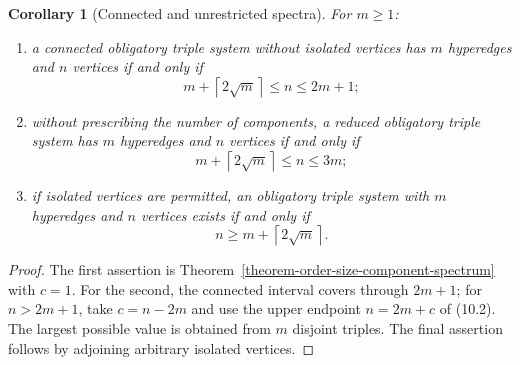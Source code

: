 \documentclass[a4paper,11pt,reqno]{amsart}
\theoremstyle{plain}
\newtheorem{corollary}[theorem]{Corollary}
\theoremstyle{definition}
\theoremstyle{remark}
\begin{document}
\begin{corollary}[Connected and unrestricted spectra]
\label{corollary-connected-order-size-spectrum}
For $m\ge1$:
\begin{enumerate}
\item a connected obligatory triple system without isolated vertices has
$m$ hyperedges and $n$ vertices if and only if
\[
m+\left\lceil2\sqrt m\right\rceil\le n\le2m+1;
\]
\item without prescribing the number of components, a reduced obligatory
triple system has $m$ hyperedges and $n$ vertices if and only if
\[
m+\left\lceil2\sqrt m\right\rceil\le n\le3m;
\]
\item if isolated vertices are permitted, an obligatory triple system with
$m$ hyperedges and $n$ vertices exists if and only if
\[
n\ge m+\left\lceil2\sqrt m\right\rceil.
\]
\end{enumerate}
\end{corollary}
\begin{proof}
The first assertion is Theorem~\ref{theorem-order-size-component-spectrum}
with $c=1$.  For the second, the connected interval covers through $2m+1$;
for $n>2m+1$, take $c=n-2m$ and use the upper endpoint $n=2m+c$ of (10.2).
The largest possible value is obtained from $m$ disjoint triples.  The final
assertion follows by adjoining arbitrary isolated vertices.
\end{proof}
\end{document}
